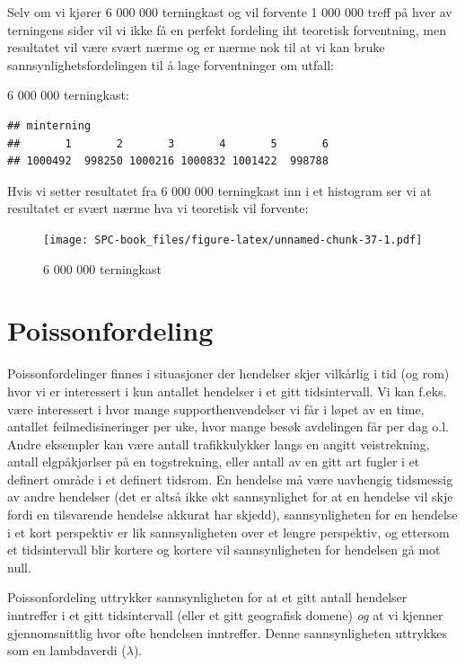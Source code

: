 \documentclass[
]{book}
\begin{document}
Selv om vi kjører 6 000 000 terningkast og vil forvente 1 000 000 treff på hver av terningens sider vil vi ikke få en perfekt fordeling iht teoretisk forventning, men resultatet vil være svært nærme og er nærme nok til at vi kan bruke sannsynlighetsfordelingen til å lage forventninger om utfall:

6 000 000 terningkast:

\begin{verbatim}
## minterning
##       1       2       3       4       5       6 
## 1000492  998250 1000216 1000832 1001422  998788
\end{verbatim}

Hvis vi setter resultatet fra 6 000 000 terningkast inn i et histogram ser vi at resultatet er svært nærme hva vi teoretisk vil forvente:

\begin{figure}
\centering
\texttt{[image: SPC-book\_files/figure-latex/unnamed-chunk-37-1.pdf]}
\caption{\label{fig:unnamed-chunk-37}6 000 000 terningkast}
\end{figure}

\hypertarget{poissonfordeling}{%
\section{Poissonfordeling}\label{poissonfordeling}}

Poissonfordelinger finnes i situasjoner der hendelser skjer vilkårlig i tid (og rom) hvor vi er interessert i kun antallet hendelser i et gitt tidsintervall. Vi kan f.eks. være interessert i hvor mange supporthenvendelser vi får i løpet av en time, antallet feilmedisineringer per uke, hvor mange besøk avdelingen får per dag o.l. Andre eksempler kan være antall trafikkulykker langs en angitt veistrekning, antall elgpåkjørlser på en togstrekning, eller antall av en gitt art fugler i et definert område i et definert tidsrom. En hendelse må være uavhengig tidsmessig av andre hendelser (det er altså ikke økt sannsynlighet for at en hendelse vil skje fordi en tilsvarende hendelse akkurat har skjedd), sannsynligheten for en hendelse i et kort perspektiv er lik sannsynligheten over et lengre perspektiv, og ettersom et tidsintervall blir kortere og kortere vil sannsynligheten for hendelsen gå mot null.

Poissonfordeling uttrykker sannsynligheten for at et gitt antall hendelser inntreffer i et gitt tidsintervall (eller et gitt geografisk domene) \emph{og} at vi kjenner gjennomsnittlig hvor ofte hendelsen inntreffer. Denne sannsynligheten uttrykkes som en lambdaverdi (\(\lambda\)).
\end{document}
